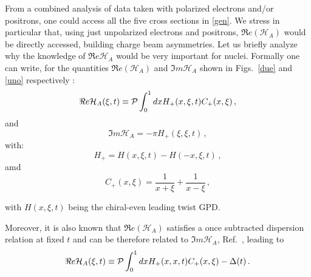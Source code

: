 \documentclass[times, twoside]{PosWhiPap}
\begin{document}
From a combined analysis of data taken with polarized electrons and/or 
positrons, one could access all the five cross sections in \eqref{gen}.
{We stress in particular that, using just unpolarized electrons and positrons, 
$\Re e(\mathcal{H}_{A})$ would be directly accessed, building charge beam 
asymmetries}. Let us briefly analyze why the knowledge of $\Re 
e\mathcal{H}_{A}$ would be very important for nuclei. Formally one can write,
for the quantities $\Re e(\mathcal{H}_{A})$ and $\Im m \mathcal{H}_{A}$
shown in Figs.~\ref{due} and \ref{uno} respectively \cite{Guidal:2013rya}:
\begin{equation}
\Re e \mathcal{H}_{A} (\xi,t) \equiv 
{\cal P} \int_0^1 dx H_+(x,\xi,t) C_+(x,\xi) \, ,
\label{ReC}
\end{equation}
and
\begin{equation}
  \Im m \mathcal{H}_{A} = -\pi H_+(\xi,\xi,t)  \, ,
\end{equation}
with:
\begin{equation}
    H_+ = H(x,\xi,t)-H(-x,\xi,t) \, ,
\end{equation}
amd
\begin{equation}
    C_+(x,\xi) = \frac{1}{x+\xi}+\frac{1}{x-\xi} \, ,
\end{equation}

with $H(x,\xi,t)$ being the chiral-even leading twist GPD.


Moreover, it is also known that $\Re e(\mathcal{H}_{A})$ satisfies
a once subtracted  dispersion relation at fixed $t$ and can be therefore 
related to $\Im m \mathcal{H}_{A}$, 
Ref.~\cite{Anikin:2007yh,Diehl:2007jb,Radyushkin:2011dh,Pasquini:2014vua}, 
leading to \begin{equation}
\Re e \mathcal{H}_{A} (\xi,t) \equiv
{\cal P} \int_0^1 dx H_+(x,x,t) C_+(x,\xi)
- \Delta(t) \, .
\label{disp}
\end{equation}
\end{document}
